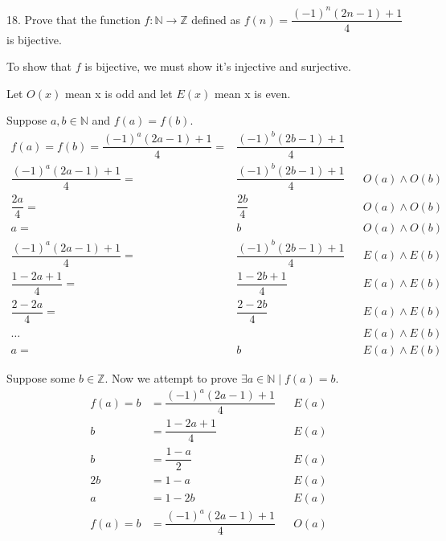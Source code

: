 \documentclass{article}
\begin{document}
\begin{exercise}{}{}
	{18. Prove that the function $f: \mathbb{N} \rightarrow
			\mathbb{Z}$ defined as \mbox{$f(n)=\dfrac{(-1)^n(2 n-1)+1}{4}$} is bijective.}
	\begin{alist}
		\item To show that $f$ is bijective, we must show it's injective and surjective.
		\item Let $O(x)$ mean x is odd and let $E(x)$ mean x is even.
		\item Suppose $a, b \in \mathbb{N}$ and $f(a)=f(b)$.
		\begin{align*}
			f(a)=f(b)=\dfrac{(-1)^a(2 a-1)+1}{4} = & \dfrac{(-1)^b(2 b-1)+1}{4}                     \\
			\dfrac{(-1)^a(2 a-1)+1}{4} =           & \dfrac{(-1)^b(2 b-1)+1}{4} &  & O(a)\land O(b) \\
			\dfrac{2 a}{4} =                       & \dfrac{2b}{4}              &  & O(a)\land O(b) \\
			a =                                    & b                          &  & O(a)\land O(b) \\
			\dfrac{(-1)^a(2 a-1)+1}{4} =           & \dfrac{(-1)^b(2 b-1)+1}{4} &  & E(a)\land E(b) \\
			\dfrac{1 - 2a + 1}{4} =                & \dfrac{1-2b+1}{4}          &  & E(a)\land E(b) \\
			\dfrac{2 - 2a}{4} =                    & \dfrac{2-2b}{4}            &  & E(a)\land E(b) \\
			\dots                                  &                            &  & E(a)\land E(b) \\
			a =                                    & b                          &  & E(a)\land E(b)
		\end{align*}
		\item Suppose some $b \in \mathbb{Z}$. Now we attempt to prove $\exists
			a\in\mathbb{N}\mid f(a)=b$.
		\begin{align*}
			f(a)=b & =\dfrac{(-1)^a(2 a-1)+1}{4} &  & E(a) \\
			b      & =\dfrac{1-2a+1}{4}          &  & E(a) \\
			b      & =\dfrac{1-a}{2}             &  & E(a) \\
			2b     & =1-a                        &  & E(a) \\
			a      & =1-2b                       &  & E(a) \\
			f(a)=b & =\dfrac{(-1)^a(2 a-1)+1}{4} &  & O(a) \\

\end{align*}
\end{alist}
\end{exercise}
\end{document}
